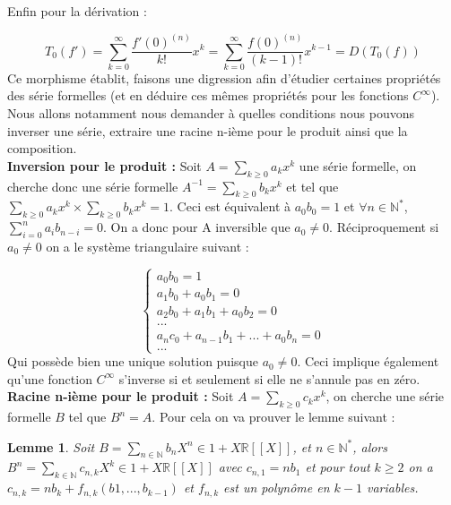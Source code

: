 \documentclass[12pt,a4paper]{amsart}
\newtheorem{lem}[thm]{\bf Lemme}
\begin{document}
Enfin pour la dérivation : 

$$T_{0}(f')= \sum_{k=0}^{\infty} \dfrac{ f'(0)^{(n)}}{k!}x^{k}=\sum_{k=0}^{\infty} \dfrac{ f(0)^{(n)}}{(k-1)!}x^{k-1}=D(T_{0}(f))$$
Ce morphisme établit, faisons une digression afin d'étudier certaines propriétés des série formelles (et en déduire ces mêmes propriétés pour les fonctions $C^{\infty}$). Nous allons notamment nous demander à quelles conditions nous pouvons inverser une série, extraire une racine n-ième pour le produit ainsi que la composition. \\

\textbf{Inversion pour le produit : } Soit $A=\sum_{k\geq0} a_{k} x^{k}$ une série formelle, on cherche donc une série formelle $A^{-1}=\sum_{k\geq0} b_{k} x^{k}$ et tel que $ \sum_{k\geq0} a_{k} x^{k} \times \sum_{k\geq0} b_{k} x^{k} = 1$. Ceci est équivalent à $a_{0}b_{0}=1$ et $\forall n \in \mathbb{N}^{\ast}$, $\sum_{i=0}^{n} a_{i}b_{n-i}=0$. On a donc pour A inversible que $a_{0}\neq 0$. Réciproquement si $a_{0} \neq 0$ on a le système triangulaire suivant : 

$$ \left\{
	\begin{array}{ll}
	a_{0}b_{0} =1 \\
	a_{1}b_{0}+a_{0}b_{1}=0\\
	a_{2}b_{0}+a_{1}b_{1}+a_{0}b_{2}=0\\
	...\\
	a_{n}c_{0}+a_{n-1}b_{1}+...+a_{0}b_{n}=0\\
	...
	\end{array}
\right.
$$
Qui possède bien une unique solution puisque $a_{0}\neq0$. Ceci implique également qu'une fonction $C^{\infty}$ s'inverse si et seulement si elle ne s'annule pas en zéro.   \\ 

\textbf{Racine n-ième pour le produit :} Soit $A=\sum_{k\geq0} c_{k} x^{k}$, on cherche une série formelle $B$ tel que $B^{n}=A$. Pour cela on va prouver le lemme suivant : 

\begin{lem} \rm 
Soit $B=\sum_{n\in \mathbb{N}} b_{n}X^{n} \in 1+X\mathbb{R}[[X]]$, et $n\in \mathbb{N}^{\ast}$, alors $B^{n}=\sum_{k\in \mathbb{N}} c_{n,k}X^{k} \in  1+X\mathbb{R}[[X]]$ avec $c_{n,1}=nb_{1}$ et pour tout $k \geq 2$ on a $c_{n,k}= nb_{k} + f_{n,k}(b1,...,b_{k-1})$  et $f_{n,k}$ est un polynôme en $k-1$ variables. 
\end{lem}
\end{document}
